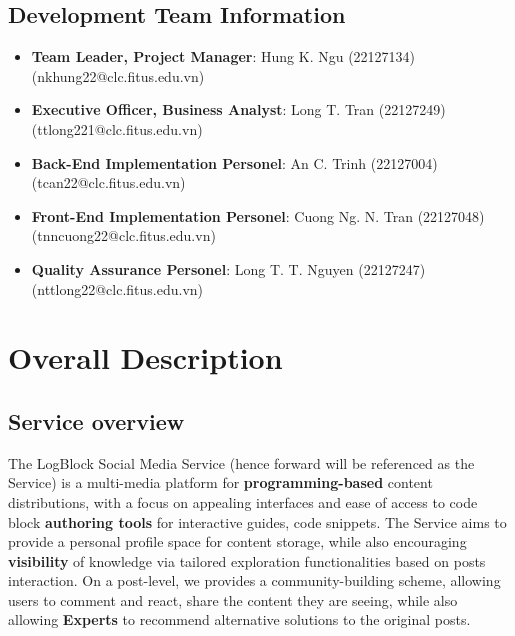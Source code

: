     \section{Development Team Information}
    \begin{itemize}
        \item \textbf{Team Leader, Project Manager}: Hung K. Ngu (22127134) (nkhung22@clc.fitus.edu.vn)
        \item \textbf{Executive Officer, Business Analyst}: Long T. Tran (22127249) (ttlong221@clc.fitus.edu.vn)
        \item \textbf{Back-End Implementation Personel}: An C. Trinh (22127004) (tcan22@clc.fitus.edu.vn)
        \item \textbf{Front-End Implementation Personel}: Cuong Ng. N. Tran (22127048) (tnncuong22@clc.fitus.edu.vn)
        \item \textbf{Quality Assurance Personel}: Long T. T. Nguyen (22127247) (nttlong22@clc.fitus.edu.vn) 
    \end{itemize}
\newpage

\chapter{Overall Description}
    \section{Service overview}
    The LogBlock Social Media Service (hence forward will be referenced as the Service) is a multi-media platform for \textbf{programming-based} content distributions, with a focus on 
    appealing interfaces and ease of access to code block \textbf{authoring tools} for interactive guides, code snippets. The Service aims to provide a personal profile space for content storage, while
    also encouraging \textbf{visibility} of knowledge via tailored exploration functionalities based on posts interaction. On a post-level, we provides a community-building scheme, allowing users
    to comment and react, share the content they are seeing, while also allowing \textbf{Experts} to recommend alternative solutions to the original posts.

